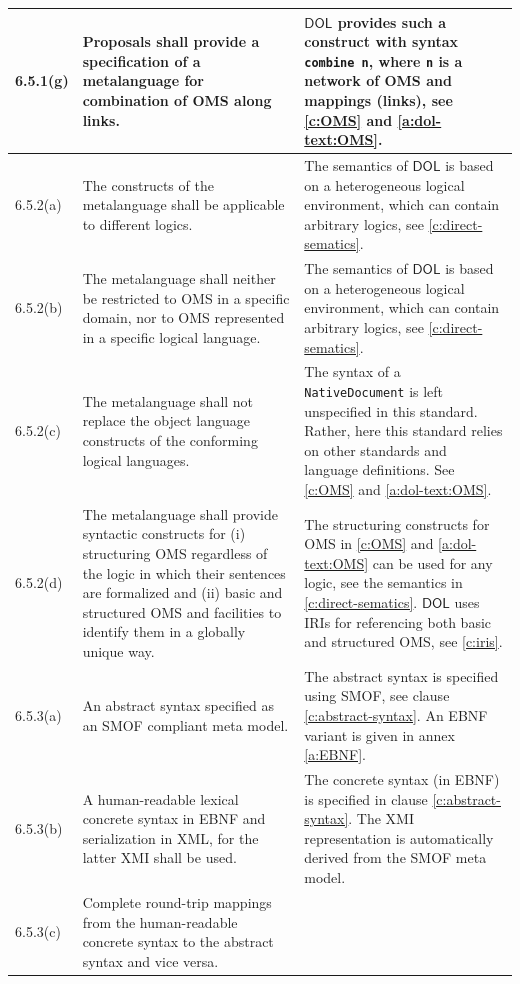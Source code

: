 \documentclass[10pt,fleqn,final]{scrreprt}
\newcommand*{\syntax}[1]{\texttt{#1}}
\newcommand*{\DOL}{\ensuremath{\mathsf{DOL}}\xspace}
\begin{document}
\begin{center}
\begin{longtable}{|p{}|p{}|p{}|}
	\\ \hline
%
6.5.1(g) & 
Proposals shall provide a specification of a metalanguage for combination of OMS along links. 	&
\DOL provides such a construct with syntax \syntax{combine n}, where \syntax{n} is a network of OMS and mappings (links),  see \ref{c:OMS} and \ref{a:dol-text:OMS}.
	\\ \hline
%
6.5.2(a)& 
The constructs of the metalanguage shall be applicable to different logics.	&
The semantics of \DOL is based on a heterogeneous logical
environment, which can contain arbitrary logics, see \ref{c:direct-sematics}.
   \\ \hline
%
6.5.2(b)& 
The metalanguage shall neither be restricted to OMS in a specific domain, nor to OMS represented
in a specific logical language.	&
The semantics of \DOL is based on a heterogeneous logical
environment, which can contain arbitrary logics, see \ref{c:direct-sematics}.
   \\ \hline
%
6.5.2(c)& 
The metalanguage shall not replace the object language constructs of the conforming logical
languages.	&
The syntax of a \syntax{NativeDocument} is left unspecified in this standard. Rather, here this standard relies on other
standards and language definitions.
See \ref{c:OMS} and \ref{a:dol-text:OMS}.
   \\ \hline
%
6.5.2(d)& 
The metalanguage shall provide syntactic constructs for (i) structuring OMS regardless of the
logic in which their sentences are formalized and (ii) basic and structured OMS and facilities to
identify them in a globally unique way.
	&
The structuring constructs for OMS in \ref{c:OMS} and \ref{a:dol-text:OMS} can be used for 
any logic, see the semantics in \ref{c:direct-sematics}. \DOL uses IRIs for referencing both basic and structured OMS, see
\ref{c:iris}.
   \\ \hline
%
6.5.3(a)& 
An abstract syntax specified as an SMOF compliant meta model.	&
 The abstract syntax is specified using SMOF, see clause \ref{c:abstract-syntax}. An EBNF variant is given in annex \ref{a:EBNF}. 
   \\ \hline
%
6.5.3(b)& 
A human-readable lexical concrete syntax in EBNF and serialization in XML, for the latter XMI shall
be used.	&
The concrete syntax (in EBNF) is specified in clause \ref{c:abstract-syntax}. The XMI representation 
is automatically derived from the SMOF meta model.
   \\ \hline
%
6.5.3(c)& 
Complete round-trip mappings from the human-readable concrete syntax to the abstract syntax and
vice versa.	&

\end{longtable}
\end{center}
\end{document}
